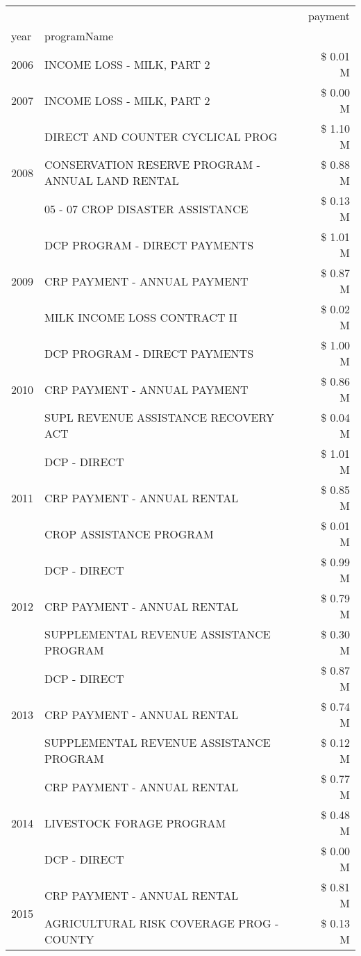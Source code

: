 \begin{tabular}{llr}
\toprule
 &  & payment \\
year & programName &  \\
\midrule
2006 & INCOME LOSS - MILK, PART 2 & \$ 0.01 M \\
\cline{1-3}
2007 & INCOME LOSS - MILK, PART 2 & \$ 0.00 M \\
\cline{1-3}
\multirow[t]{3}{*}{2008} & DIRECT AND COUNTER CYCLICAL PROG & \$ 1.10 M \\
 & CONSERVATION RESERVE PROGRAM - ANNUAL LAND RENTAL & \$ 0.88 M \\
 & 05 - 07 CROP DISASTER ASSISTANCE & \$ 0.13 M \\
\cline{1-3}
\multirow[t]{3}{*}{2009} & DCP PROGRAM - DIRECT PAYMENTS & \$ 1.01 M \\
 & CRP PAYMENT - ANNUAL PAYMENT & \$ 0.87 M \\
 & MILK INCOME LOSS CONTRACT II & \$ 0.02 M \\
\cline{1-3}
\multirow[t]{3}{*}{2010} & DCP PROGRAM - DIRECT PAYMENTS & \$ 1.00 M \\
 & CRP PAYMENT - ANNUAL PAYMENT & \$ 0.86 M \\
 & SUPL REVENUE ASSISTANCE RECOVERY ACT & \$ 0.04 M \\
\cline{1-3}
\multirow[t]{3}{*}{2011} & DCP - DIRECT & \$ 1.01 M \\
 & CRP PAYMENT - ANNUAL RENTAL & \$ 0.85 M \\
 & CROP ASSISTANCE PROGRAM & \$ 0.01 M \\
\cline{1-3}
\multirow[t]{3}{*}{2012} & DCP - DIRECT & \$ 0.99 M \\
 & CRP PAYMENT - ANNUAL RENTAL & \$ 0.79 M \\
 & SUPPLEMENTAL REVENUE ASSISTANCE PROGRAM & \$ 0.30 M \\
\cline{1-3}
\multirow[t]{3}{*}{2013} & DCP - DIRECT & \$ 0.87 M \\
 & CRP PAYMENT - ANNUAL RENTAL & \$ 0.74 M \\
 & SUPPLEMENTAL REVENUE ASSISTANCE PROGRAM & \$ 0.12 M \\
\cline{1-3}
\multirow[t]{3}{*}{2014} & CRP PAYMENT - ANNUAL RENTAL & \$ 0.77 M \\
 & LIVESTOCK FORAGE PROGRAM & \$ 0.48 M \\
 & DCP - DIRECT & \$ 0.00 M \\
\cline{1-3}
\multirow[t]{3}{*}{2015} & CRP PAYMENT - ANNUAL RENTAL & \$ 0.81 M \\
 & AGRICULTURAL RISK COVERAGE PROG - COUNTY & \$ 0.13 M \\

\end{tabular}
